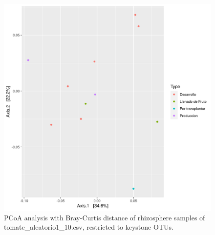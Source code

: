 \begin{figure}
  \centering
  \includegraphics[scale = 0.7]{pcoa_key_otus_tomate_aleatorio1_10.csv.png}
  \caption{PCoA analysis with Bray-Curtis distance of rhizosphere samples of tomate_aleatorio1_10.csv, restricted to keystone OTUs.}
  \label{fig:tomate_aleatorio1_10.csv_pcoa_key_otus}
\end{figure}
